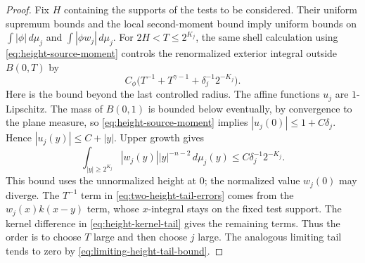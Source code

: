\begin{proof}
Fix $H$ containing the supports of the tests to be considered.  Their
uniform supremum bounds and the local second-moment bound imply uniform
bounds on
$\int|\phi|\,d\mu_j$ and $\int|\phi w_j|\,d\mu_j$.
For $2H<T\le 2^{K_j}$, the same shell calculation using
\eqref{eq:height-source-moment} controls the renormalized exterior
integral outside $B(0,T)$ by
\begin{equation}\label{eq:two-height-tail-errors}
 C_\phi\bigl(T^{-1}+T^{\gamma-1}
                    +\delta_j^{-1}2^{-K_j}\bigr).
\end{equation}
Here is the bound beyond the last controlled radius.  The affine functions
$u_j$ are $1$-Lipschitz.  The mass of $B(0,1)$ is bounded below eventually,
by convergence to the plane measure, so
\eqref{eq:height-source-moment} implies
$|u_j(0)|\le1+C\delta_j$.  Hence $|u_j(y)|\le C+|y|$.
Upper growth gives
\[
 \int_{|y|\ge2^{K_j}}|w_j(y)||y|^{-n-2}\,d\mu_j(y)
      \le C\delta_j^{-1}2^{-K_j}.
\]
This bound uses the unnormalized height at $0$; the normalized value
$w_j(0)$ may diverge.  The $T^{-1}$ term in
\eqref{eq:two-height-tail-errors} comes from the $w_j(x)k(x-y)$ term,
whose $x$-integral stays on the fixed test support.  The kernel difference
in \eqref{eq:height-kernel-tail} gives the remaining terms.  Thus the order
is to choose $T$ large and then choose $j$ large.  The analogous limiting
tail tends to zero by \eqref{eq:limiting-height-tail-bound}.


\end{proof}
